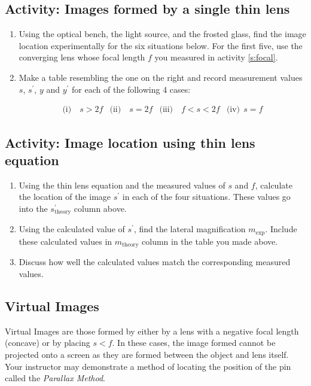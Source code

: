 \subsection{Activity: Images formed by a single thin lens}\label{s:thinlens}
\begin{enumerate}[resume]
	\item Using the optical bench, the light source, and the frosted glass, find the image location experimentally for the six situations below. For the first five, use the converging lens whose focal length $f$ you measured in activity \ref{s:focal}. 
	\item \label{item:cases}Make a table resembling the one on the right and record measurement values $s$, $s^{\prime}$, $y$ and $y^{\prime}$ for each of the following 4 cases:

\begin{equation*}
\begin{array}{llll}
	\text{(i)} \quad s > 2f	& \text{(ii)} \quad s = 2f 
	& \text{(iii)} \quad f < s < 2f &
	\text{(iv)}\;\, s = f	%
\end{array}
\end{equation*}
\end{enumerate}

\subsection{Activity: Image location using thin lens equation}
\begin{enumerate}[resume]
	\item Using the thin lens equation and the measured values of $s$ and $f$, calculate the location of the image $s^{\prime}$ in each of the four situations. These values go into the $s^{\prime}_{\textrm{theory}}$ column above.
	\item Using the calculated value of $s^{\prime}$, find the lateral magnification $m_{\textrm{exp}}$. Include these calculated values in $m_{\textrm{theory}}$ column in the table you made above. 
	\item Discuss how well the calculated values match the corresponding measured values. 
\end{enumerate}

\subsection{Virtual Images}
	Virtual Images are those formed by either by a lens with a negative focal length (concave) or by placing $s < f$.  In these cases, the image formed cannot be projected onto a screen as they are formed between the object and lens itself.  Your instructor may demonstrate a method of locating the position of the pin called the \textit{Parallax Method}.
	
